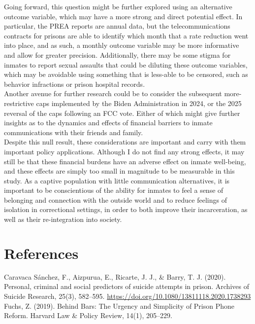 \documentclass[12pt,a4paper]{article}
\begin{document}
Going forward, this question might be further explored using an alternative outcome variable, which may have a more strong and direct potential effect. In particular, the PREA reports are annual data, but the telecommunications contracts for prisons are able to identify which month that a rate reduction went into place, and as such, a monthly outcome variable may be more informative and allow for greater precision. Additionally, there may be some stigma for inmates to report sexual assaults that could be diluting these outcome variables, which may be avoidable using something that is less-able to be censored, such as behavior infractions or prison hospital records. \\

Another avenue for further research could be to consider the subsequent more-restrictive caps implemented by the Biden Administration in 2024, or the 2025 reversal of the caps following an FCC vote. Either of which might give further insights as to the dynamics and effects of financial barriers to inmate communications with their friends and family. \\

Despite this null result, these considerations are important and carry with them important policy applications. Although I do not find any strong effects, it may still be that these financial burdens have an adverse effect on inmate well-being, and these effects are simply too small in magnitude to be measurable in this study. As a captive population with little communication alternatives, it is important to be conscientious of the ability for inmates to feel a sense of belonging and connection with the outside world and to reduce feelings of isolation in correctional settings, in order to both improve their incarceration, as well as their re-integration into society. \\

\section{References}
Caravaca Sánchez, F., Aizpurua, E., Ricarte, J. J., \& Barry, T. J. (2020). Personal, criminal and social predictors of suicide attempts in prison. Archives of Suicide Research, 25(3), 582–595. \url{https://doi.org/10.1080/13811118.2020.1738293} \\

Fuchs, Z. (2019). Behind Bars: The Urgency and Simplicity of Prison Phone Reform. Harvard Law \& Policy Review, 14(1), 205–229. \\
\end{document}
